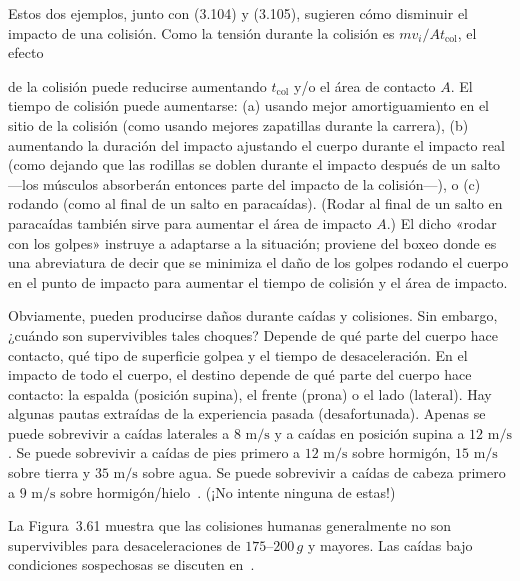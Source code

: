 \documentclass[12pt]{book}
\begin{document}
Estos dos ejemplos, junto con (3.104) y (3.105), sugieren cómo disminuir el impacto de una colisión. Como la tensión durante la colisión es $mv_i/At_{\text{col}}$, el efecto


de la colisión puede reducirse aumentando $t_{\text{col}}$ y/o el área de contacto $A$. El tiempo de colisión puede aumentarse: (a) usando mejor amortiguamiento en el sitio de la colisión (como usando mejores zapatillas durante la carrera), (b) aumentando la duración del impacto ajustando el cuerpo durante el impacto real (como dejando que las rodillas se doblen durante el impacto después de un salto ---los músculos absorberán entonces parte del impacto de la colisión---), o (c) rodando (como al final de un salto en paracaídas). (Rodar al final de un salto en paracaídas también sirve para aumentar el área de impacto $A$.) El dicho «rodar con los golpes» instruye a adaptarse a la situación; proviene del boxeo donde es una abreviatura de decir que se minimiza el daño de los golpes rodando el cuerpo en el punto de impacto para aumentar el tiempo de colisión y el área de impacto.

Obviamente, pueden producirse daños durante caídas y colisiones. Sin embargo, ¿cuándo son supervivibles tales choques? Depende de qué parte del cuerpo hace contacto, qué tipo de superficie golpea y el tiempo de desaceleración. En el impacto de todo el cuerpo, el destino depende de qué parte del cuerpo hace contacto: la espalda (posición supina), el frente (prona) o el lado (lateral). Hay algunas pautas extraídas de la experiencia pasada (desafortunada). Apenas se puede sobrevivir a caídas laterales a $8\text{ m/s}$ y a caídas en posición supina a $12\text{ m/s}$. Se puede sobrevivir a caídas de pies primero a $12\text{ m/s}$ sobre hormigón, $15\text{ m/s}$ sobre tierra y $35\text{ m/s}$ sobre agua. Se puede sobrevivir a caídas de cabeza primero a $9\text{ m/s}$ sobre hormigón/hielo~\cite{ref20}. (¡No intente ninguna de estas!)

La Figura~3.61 muestra que las colisiones humanas generalmente no son supervivibles para desaceleraciones de $175$--$200\,g$ y mayores. Las caídas bajo condiciones sospechosas se discuten en~\cite{ref32}.
\end{document}
